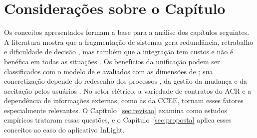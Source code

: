 \section{Considerações sobre o Capítulo}

Os conceitos apresentados formam a base para a análise dos capítulos seguintes. A literatura mostra que a fragmentação de sistemas gera redundância, retrabalho e dificuldade de decisão \citep{laudon2020,elmasri2016}, mas também que a integração tem custos e não é benéfica em todas as situações \citep{goodhue1992}. Os benefícios da unificação podem ser classificados com o modelo de \citet{shang2002} e avaliados com as dimensões de \citet{delone2003}; sua concretização depende do redesenho dos processos \citep{hammer1990,dumas2018}, da gestão da mudança \citep{nah2001} e da aceitação pelos usuários \citep{davis1989,venkatesh2003}. No setor elétrico, a variedade de contratos do ACR e a dependência de informações externas, como as da CCEE, tornam esses fatores especialmente relevantes. O Capítulo~\ref{sec:revisao} examina como estudos empíricos trataram essas questões, e o Capítulo~\ref{sec:proposta} aplica esses conceitos ao caso do aplicativo InLight.

